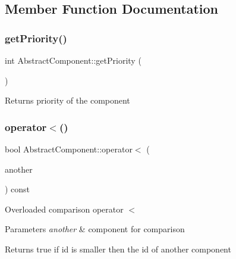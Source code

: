 \subsection{Member Function Documentation}
\mbox{\label{class_abstract_component_ac0b440d1d642ff1292ec3c544d75a8f1}} 
\subsubsection{\texorpdfstring{get\+Priority()}{getPriority()}}
{\footnotesize\ttfamily int Abstract\+Component\+::get\+Priority (\begin{DoxyParamCaption}{ }\end{DoxyParamCaption})\hspace{0.3cm}{\ttfamily [inline]}}

\begin{DoxyReturn}{Returns}
priority of the component 
\end{DoxyReturn}
\mbox{\label{class_abstract_component_a0c2e458144111c5f599c66f168516abc}} 
\subsubsection{\texorpdfstring{operator$<$()}{operator<()}}
{\footnotesize\ttfamily bool Abstract\+Component\+::operator$<$ (\begin{DoxyParamCaption}\item[{const \hyperlink{class_abstract_component}{Abstract\+Component} \&}]{another }\end{DoxyParamCaption}) const}

Overloaded comparison operator \textquotesingle{}$<$\textquotesingle{}


\begin{DoxyParams}{Parameters}
{\em another} & component for comparison \\
\hline
\end{DoxyParams}
\begin{DoxyReturn}{Returns}
true if id is smaller then the id of another component 
\end{DoxyReturn}
\mbox{\label{class_abstract_component_a58a59a9ea6c3b4c86fb3bf98ff1eaaef}} 
